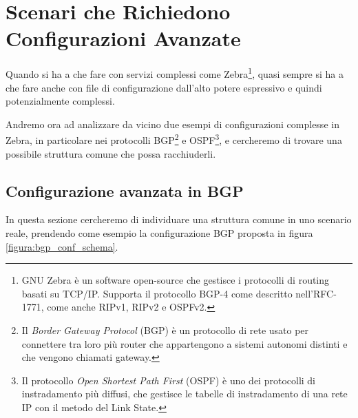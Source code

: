 \section{Scenari che Richiedono Configurazioni Avanzate}
Quando si ha a che fare con servizi complessi come Zebra\footnote{GNU Zebra è un software open-source che gestisce i protocolli di routing basati su TCP/IP. Supporta il protocollo BGP-4 come descritto nell'RFC-1771, come anche RIPv1, RIPv2 e OSPFv2.}, quasi sempre si ha a che fare anche con file di configurazione dall'alto potere espressivo e quindi potenzialmente complessi.

Andremo ora ad analizzare da vicino due esempi di configurazioni complesse in Zebra, in particolare nei protocolli BGP\footnote{Il \emph{Border Gateway Protocol} (BGP) è un protocollo di rete usato per connettere tra loro più router che appartengono a sistemi autonomi distinti e che vengono chiamati gateway.} e OSPF\footnote{Il protocollo \emph{Open Shortest Path First} (OSPF) è uno dei protocolli di instradamento più diffusi, che gestisce le tabelle di instradamento di una rete IP con il metodo del Link State.}, e cercheremo di trovare una possibile struttura comune che possa racchiuderli.

\subsection{Configurazione avanzata in BGP}
In questa sezione cercheremo di individuare una struttura comune in uno scenario reale, prendendo come esempio la configurazione BGP proposta in figura \ref{figura:bgp_conf_schema}.

